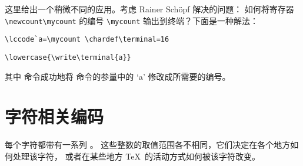 \documentclass{book}
\begin{document}
这里给出一个稍微不同的应用。考虑 Rainer Sch\"opf 解决的问题：
如何将寄存器 \verb-\newcount\mycount- 的编号 \verb-\mycount-
输出到终端？下面是一种解法：
\begin{verbatim}
\lccode`a=\mycount \chardef\terminal=16
\end{verbatim}
\begin{verbatim}
\lowercase{\write\terminal{a}}
\end{verbatim}
其中  命令成功地将  命令的参量中的
`\n a' 修改成所需要的编号。

\section{字符相关编码}
\label{codename}

每个字符都带有一系列 。
这些整数的取值范围各不相同，它们决定在各个地方如何处理该字符，
或者在某些地方 \TeX\ 的活动方式如何被该字符改变。
\end{document}
